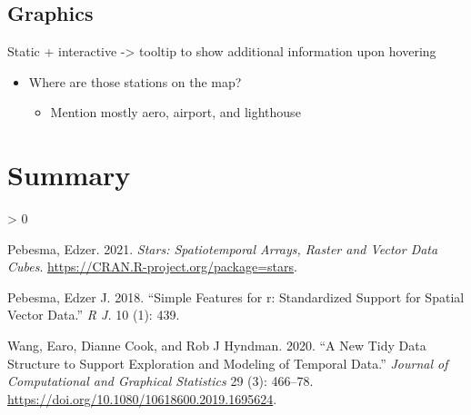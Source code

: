 \documentclass{article}
\newlength{\cslhangindent}
\newenvironment{CSLReferences}[2] %
 {%
  \setlength{\parindent}{0pt}
  \ifodd #1 \everypar{\setlength{\hangindent}{\cslhangindent}}\ignorespaces\fi
  \ifnum #2 > 0
  \setlength{\parskip}{#2\baselineskip}
  \fi
 }%
 {}
\begin{document}
\hypertarget{graphics}{%
\subsection{Graphics}\label{graphics}}

Static + interactive -\textgreater{} tooltip to show additional
information upon hovering

\begin{itemize}
\tightlist
\item
  Where are those stations on the map?

  \begin{itemize}
  \tightlist
  \item
    Mention mostly aero, airport, and lighthouse
  \end{itemize}
\end{itemize}

\hypertarget{summary}{%
\section*{Summary}\label{summary}}

\hypertarget{refs}{}
\begin{CSLReferences}{1}{0}
\leavevmode\hypertarget{ref-stars}{}%
Pebesma, Edzer. 2021. \emph{Stars: Spatiotemporal Arrays, Raster and
Vector Data Cubes}. \url{https://CRAN.R-project.org/package=stars}.

\leavevmode\hypertarget{ref-pebesma2018simple}{}%
Pebesma, Edzer J. 2018. {``Simple Features for r: Standardized Support
for Spatial Vector Data.''} \emph{R J.} 10 (1): 439.

\leavevmode\hypertarget{ref-tsibbles}{}%
Wang, Earo, Dianne Cook, and Rob J Hyndman. 2020. {``A New Tidy Data
Structure to Support Exploration and Modeling of Temporal Data.''}
\emph{Journal of Computational and Graphical Statistics} 29 (3):
466--78. \url{https://doi.org/10.1080/10618600.2019.1695624}.

\end{CSLReferences}



\end{document}
